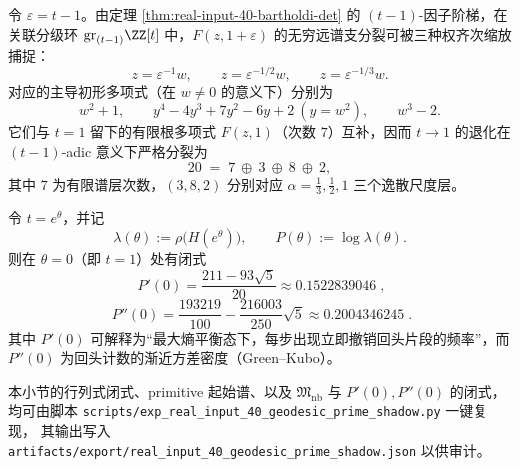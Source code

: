 \begin{remark}\label{rem:real-input-40-bartholdi-graded-spectrum}
令 \(\varepsilon=t-1\)。由定理 \ref{thm:real-input-40-bartholdi-det} 的 \((t-1)\)-因子阶梯，在关联分级环 \(\mathrm{gr}_{(t-1)}\ZZ[t]\) 中，\(F(z,1+\varepsilon)\) 的无穷远谱支分裂可被三种权齐次缩放捕捉：
\[
z=\varepsilon^{-1}w,\qquad z=\varepsilon^{-1/2}w,\qquad z=\varepsilon^{-1/3}w.
\]
对应的主导初形多项式（在 \(w\neq 0\) 的意义下）分别为
\[
w^2+1,\qquad
y^4-4y^3+7y^2-6y+2\ (y=w^2),\qquad
w^3-2.
\]
它们与 \(t=1\) 留下的有限根多项式 \(F(z,1)\)（次数 \(7\)）互补，因而 \(t\to 1\) 的退化在 \((t-1)\)-adic 意义下严格分裂为
\[
20 \;=\; 7\ \oplus\ 3\ \oplus\ 8\ \oplus\ 2,
\]
其中 \(7\) 为有限谱层次数，\((3,8,2)\) 分别对应 \(\alpha=\tfrac13,\tfrac12,1\) 三个逸散尺度层。
\end{remark}
\begin{theorem}[回头密度与回头方差的闭式]\label{thm:real-input-40-backtracking-cumulants}
令 \(t=e^{\theta}\)，并记
\[
\lambda(\theta):=\rho\!\bigl(H(e^{\theta})\bigr),\qquad
P(\theta):=\log\lambda(\theta).
\]
则在 \(\theta=0\)（即 \(t=1\)）处有闭式
\[
\boxed{\;
P'(0)=\frac{211-93\sqrt5}{20}\approx 0.1522839046\;},
\]
\[
\boxed{\;
P''(0)=\frac{193219}{100}-\frac{216003}{250}\sqrt5\approx 0.2004346245\; }.
\]
其中 \(P'(0)\) 可解释为“最大熵平衡态下，每步出现立即撤销回头片段的频率”，而 \(P''(0)\) 为回头计数的渐近方差密度（Green--Kubo）。
\end{theorem}

\begin{remark}[可复现计算链]\label{rem:real-input-40-geodesic-repro}
本小节的行列式闭式、primitive 起始谱、以及 \(\mathfrak{M}_{\mathrm{nb}}\) 与 \(P'(0),P''(0)\) 的闭式，
均可由脚本 \texttt{scripts/exp\_real\_input\_40\_geodesic\_prime\_shadow.py} 一键复现，
其输出写入 \texttt{artifacts/export/real\_input\_40\_geodesic\_prime\_shadow.json} 以供审计。
\end{remark}

